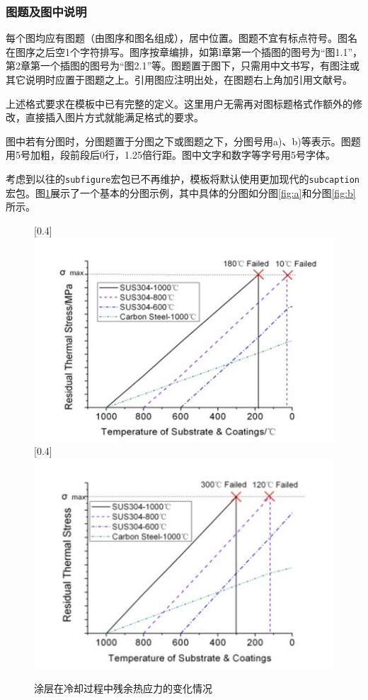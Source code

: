 \subsubsection{图题及图中说明}

每个图均应有图题（由图序和图名组成），居中位置。图题不宜有标点符号。图名在图序之后空1个字符排写。图序按章编排，如第l章第一个插图的图号为“图1.1”，第2章第一个插图的图号为“图2.1”等。图题置于图下，只需用中文书写，有图注或其它说明时应置于图题之上。引用图应注明出处，在图题右上角加引用文献号。

上述格式要求在模板中已有完整的定义。这里用户无需再对图标题格式作额外的修改，直接插入图片方式就能满足格式的要求。

图中若有分图时，分图题置于分图之下或图题之下，分图号用a)、b)等表示。图题用5号加粗，段前段后0行，1.25倍行距。图中文字和数字等字号用5号字体。

考虑到以往的\texttt{subfigure}宏包已不再维护，模板将默认使用更加现代的\texttt{subcaption}宏包。图\ref{fig:figures}展示了一个基本的分图示例，其中具体的分图如分图\ref{fig:a}和分图\ref{fig:b}所示。

\begin{figure}[!h]
  \centering
  [0.4\linewidth]{
    \includegraphics{figure/subfig1.jpg}}
  [0.4\linewidth]{
    \includegraphics{figure/subfig2.jpg}}
  \caption{涂层在冷却过程中残余热应力的变化情况}
  \label{fig:figures}
\end{figure}

